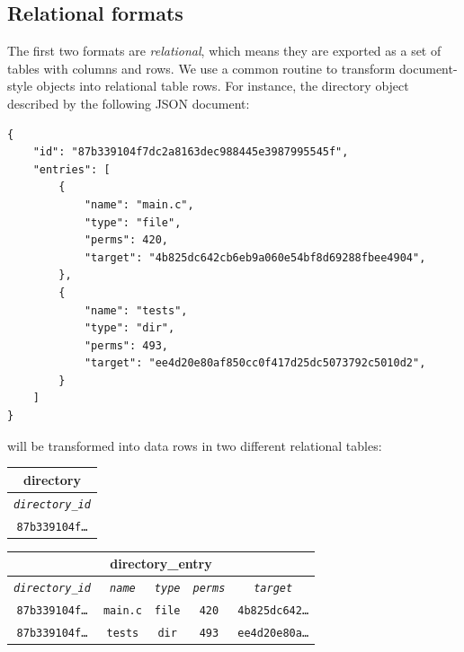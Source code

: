 \subsection{Relational formats}
The first two formats are \emph{relational}, which means they are exported as a
set of tables with columns and rows. We use a common routine to transform
document-style objects into relational table rows. For instance, the directory
object described by the following JSON document:

{\footnotesize
\begin{verbatim}
{
    "id": "87b339104f7dc2a8163dec988445e3987995545f",
    "entries": [
        {
            "name": "main.c",
            "type": "file",
            "perms": 420,
            "target": "4b825dc642cb6eb9a060e54bf8d69288fbee4904",
        },
        {
            "name": "tests",
            "type": "dir",
            "perms": 493,
            "target": "ee4d20e80af850cc0f417d25dc5073792c5010d2",
        }
    ]
}
\end{verbatim}
}

will be transformed into data rows in two different relational tables:

\vspace{1em}

\begin{center}
\begin{tabular}{|c|}
    \multicolumn{1}{c}{\textbf{directory}} \\ \hline
    \emph{\texttt{directory\_id}} \\ \hline
    \texttt{87b339104f\ldots} \\ \hline
\end{tabular}
\qquad
\begin{tabular}{|c|c|c|c|c|}
    \multicolumn{5}{c}{\textbf{directory\_entry}} \\ \hline
    \emph{\texttt{directory\_id}} & \emph{\texttt{name}} & \emph{\texttt{type}}
                                  & \emph{\texttt{perms}} &
                                  \emph{\texttt{target}} \\ \hline
    \texttt{87b339104f\ldots} & \texttt{main.c} & \texttt{file} & \texttt{420}
                              & \texttt{4b825dc642\ldots} \\ \hline
    \texttt{87b339104f\ldots} & \texttt{tests} & \texttt{dir} & \texttt{493}
                              & \texttt{ee4d20e80a\ldots} \\ \hline
\end{tabular}
\end{center}

